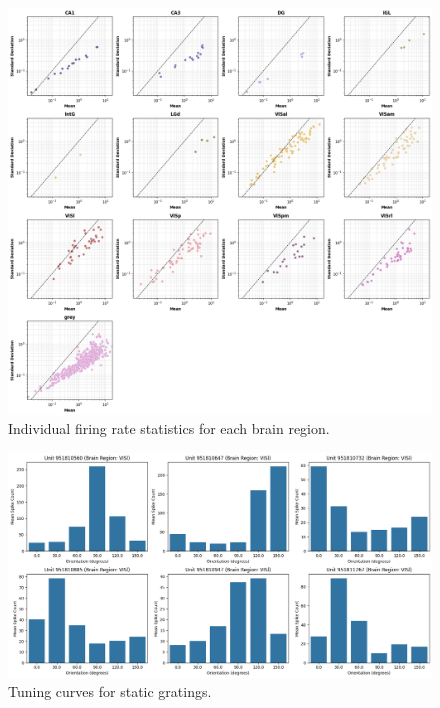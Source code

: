 \documentclass[10pt,twocolumn]{article}
\begin{document}
\begin{figure}[ht]
\centering
\includegraphics[width=\linewidth]{report_images/unit_firing_rate_statistics_single.png}
\caption{Individual firing rate statistics for each brain region.}
\label{fig:firing_rate_single}
\end{figure}

\begin{figure}[ht]
\centering
\includegraphics[width=\linewidth]{report_images/static_tuning_curves.png}
\caption{Tuning curves for static gratings.}
\label{fig:static_tuning}
\end{figure}
\end{document}
